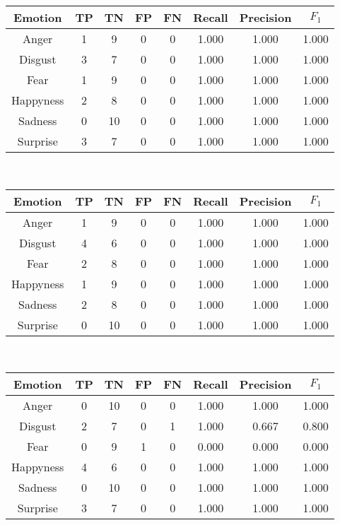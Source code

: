\documentclass[a4paper]{article}
\begin{document}
\begin{center}
  \begin{tabular}{c|cccc|ccc}
  \hline
    Emotion & TP & TN & FP & FN & Recall & Precision & $F_1$ \\
    \hline
    Anger & 1 & 9 & 0 & 0	 & 1.000 & 1.000 & 1.000\\
Disgust & 3 & 7 & 0 & 0	 & 1.000 & 1.000 & 1.000\\
Fear & 1 & 9 & 0 & 0	 & 1.000 & 1.000 & 1.000\\
Happyness & 2 & 8 & 0 & 0	 & 1.000 & 1.000 & 1.000\\
Sadness & 0 & 10 & 0 & 0	 & 1.000 & 1.000 & 1.000\\
Surprise & 3 & 7 & 0 & 0	 & 1.000 & 1.000 & 1.000\\
  \end{tabular}\\
  
  \begin{tabular}{c|cccc|ccc}
  \hline
    Emotion & TP & TN & FP & FN & Recall & Precision & $F_1$ \\
    \hline
    Anger & 1 & 9 & 0 & 0	 & 1.000 & 1.000 & 1.000\\
Disgust & 4 & 6 & 0 & 0	 & 1.000 & 1.000 & 1.000\\
Fear & 2 & 8 & 0 & 0	 & 1.000 & 1.000 & 1.000\\
Happyness & 1 & 9 & 0 & 0	 & 1.000 & 1.000 & 1.000\\
Sadness & 2 & 8 & 0 & 0	 & 1.000 & 1.000 & 1.000\\
Surprise & 0 & 10 & 0 & 0	 & 1.000 & 1.000 & 1.000\\
  \end{tabular}\\
  
  \begin{tabular}{c|cccc|ccc}
  \hline
    Emotion & TP & TN & FP & FN & Recall & Precision & $F_1$ \\
    \hline
    Anger & 0 & 10 & 0 & 0	 & 1.000 & 1.000 & 1.000\\
Disgust & 2 & 7 & 0 & 1	 & 1.000 & 0.667 & 0.800\\
Fear & 0 & 9 & 1 & 0	 & 0.000 & 0.000 & 0.000\\
Happyness & 4 & 6 & 0 & 0	 & 1.000 & 1.000 & 1.000\\
Sadness & 0 & 10 & 0 & 0	 & 1.000 & 1.000 & 1.000\\
Surprise & 3 & 7 & 0 & 0	 & 1.000 & 1.000 & 1.000\\
  \end{tabular}\\
  

\end{center}
\end{document}
